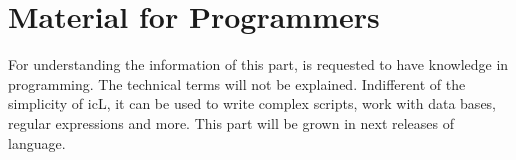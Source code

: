 \part{Material for Programmers}

For understanding the information of this part, is requested to have knowledge in programming. The technical terms will not be explained. Indifferent of the simplicity of icL, it can be used to write complex scripts, work with data bases, regular expressions and more. This part will be grown in next releases of language.

